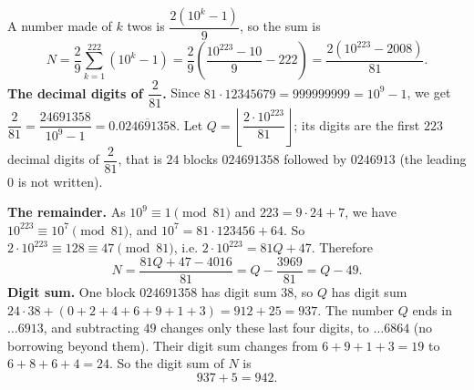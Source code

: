 A number made of $k$ twos is $\dfrac{2\left(10^k-1\right)}{9}$, so the sum is
\[N=\dfrac29\sum_{k=1}^{222}\left(10^k-1\right)=\dfrac29\left(\dfrac{10^{223}-10}{9}-222\right)=\dfrac{2\left(10^{223}-2008\right)}{81}.\]
\textbf{The decimal digits of $\dfrac{2}{81}$.} Since $81\cdot12345679=999999999=10^9-1$, we get $\dfrac{2}{81}=\dfrac{24691358}{10^9-1}=0.\overline{024691358}$. Let $Q=\left\lfloor\dfrac{2\cdot10^{223}}{81}\right\rfloor$; its digits are the first $223$ decimal digits of $\dfrac{2}{81}$, that is $24$ blocks $024691358$ followed by $0246913$ (the leading $0$ is not written).

\textbf{The remainder.} As $10^9\equiv1\pmod{81}$ and $223=9\cdot24+7$, we have $10^{223}\equiv10^7\pmod{81}$, and $10^7=81\cdot123456+64$. So $2\cdot10^{223}\equiv128\equiv47\pmod{81}$, i.e. $2\cdot10^{223}=81Q+47$. Therefore
\[N=\dfrac{81Q+47-4016}{81}=Q-\dfrac{3969}{81}=Q-49.\]
\textbf{Digit sum.} One block $024691358$ has digit sum $38$, so $Q$ has digit sum $24\cdot38+(0+2+4+6+9+1+3)=912+25=937$. The number $Q$ ends in $\dots6913$, and subtracting $49$ changes only these last four digits, to $\dots6864$ (no borrowing beyond them). Their digit sum changes from $6+9+1+3=19$ to $6+8+6+4=24$. So the digit sum of $N$ is
\[937+5=\boxed{942}.\]
